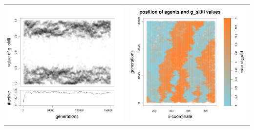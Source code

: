 \documentclass[a4paper,10pt]{article}
\begin{document}
\begin{table}[H]
\begin{tabular}{cc}
 \newline
 \includegraphics[width=\imgSize]{../images/5StaticEnv/Gplot9_staticEnv1}&\includegraphics[width=\imgSize]{../images/5StaticEnv/Gplot9Static_staticEnv1}\\
\end{tabular}

\end{table}
\end{document}

